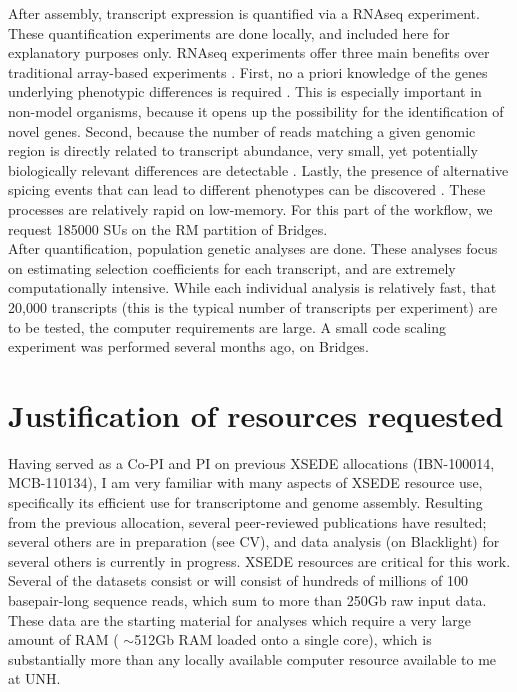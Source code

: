 \documentclass[10.5pt]{article}
\begin{document}
{\noindent
After assembly, transcript expression is quantified via a RNAseq experiment. These quantification experiments are done locally, and included here for explanatory purposes only. RNAseq experiments offer three main benefits over traditional array-based experiments \citep{tHoen:2008hn}. First, no a priori knowledge of the genes underlying phenotypic differences is required \citep{Gilad:2009km}.  This is especially important in non-model organisms, because it opens up the possibility for the identification of novel genes. Second, because the number of reads matching a given genomic region is directly related to transcript abundance, very small, yet potentially biologically relevant differences are detectable \citep{Mortazavi:2008jj}.  Lastly, the presence of alternative spicing events that can lead to different phenotypes can be discovered \citep{Sultan:2008jh}. These processes are relatively rapid on low-memory. For this part of the workflow, we request 185000 SUs on the RM partition of Bridges. \\

\noindent
After quantification, population genetic analyses are done. These analyses focus on estimating selection coefficients for each transcript, and are extremely computationally intensive. While each individual analysis is relatively fast, that 20,000 transcripts (this is the typical number of transcripts per experiment) are to be tested, the computer requirements are large. A small code scaling experiment was performed several months ago, on Bridges.  \\

\section*{Justification of resources requested}
Having served as a Co-PI and PI on previous XSEDE allocations (IBN-100014, MCB-110134), I am very familiar with many aspects of XSEDE resource use, specifically its efficient use for transcriptome and genome assembly.  Resulting from the previous allocation, several peer-reviewed publications have resulted; several others are in preparation (see CV), and data analysis (on Blacklight) for several others is currently in progress.  XSEDE resources are critical for this work.  Several of the datasets consist or will consist of hundreds of millions of 100 basepair-long sequence reads, which sum to more than 250Gb raw input data. These data are the starting material for analyses which require a very large amount of RAM ( $\sim$512Gb RAM loaded onto a single core), which is substantially more than any locally available computer resource available to me at UNH.  \\


}
\end{document}
